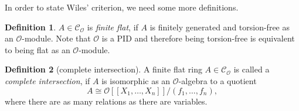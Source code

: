 \documentclass{article}
\theoremstyle{plain}%
\theoremstyle{definition}
\newtheorem{definition}{Definition}[section]
\theoremstyle{remark}
\newcommand{\co}{\mathcal{C}_\mathcal{O}}
\begin{document}
In order to state Wiles' criterion, we need some more definitions.
\begin{definition}
    \(A \in \co\) is \textit{finite flat}, if \(A\) is finitely generated 
    and torsion-free as an \(\mathcal{O}\)-module.
    Note that \(\mathcal{O}\) is a PID and therefore being torsion-free 
    is equivalent to being flat as an \(\mathcal{O}\)-module.
\end{definition}

\begin{definition}[complete intersection]\cite[see][Def. 5.1]{darmon1995fermat}
    A finite flat ring \(A \in \co\) is called a \textit{complete intersection}, 
    if \(A\) is isomorphic as an \(\mathcal{O}\)-algebra to a quotient
    \[A \cong \mathcal{O}[[X_1, \dots, X_n]]/(f_1, \dots, f_n),\] 
    where there are as many relations as there are variables.
\end{definition}
\end{document}
